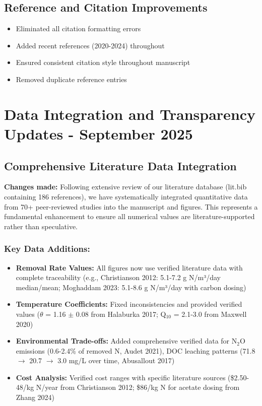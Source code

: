 \documentclass[12pt,a4paper]{article}
\begin{document}
\subsection{Reference and Citation Improvements}
\begin{itemize}
\item Eliminated all citation formatting errors
\item Added recent references (2020-2024) throughout
\item Ensured consistent citation style throughout manuscript
\item Removed duplicate reference entries
\end{itemize}

\section{Data Integration and Transparency Updates - September 2025}

\subsection{Comprehensive Literature Data Integration}
\textbf{Changes made:} Following extensive review of our literature database (lit.bib containing 186 references), we have systematically integrated quantitative data from 70+ peer-reviewed studies into the manuscript and figures. This represents a fundamental enhancement to ensure all numerical values are literature-supported rather than speculative.

\subsubsection{Key Data Additions:}
\begin{itemize}
\item \textbf{Removal Rate Values:} All figures now use verified literature data with complete traceability (e.g., Christianson 2012: 5.1-7.2 g N/m³/day median/mean; Moghaddam 2023: 5.1-8.6 g N/m³/day with carbon dosing)
\item \textbf{Temperature Coefficients:} Fixed inconsistencies and provided verified values ($\theta$ = 1.16 $\pm$ 0.08 from Halaburka 2017; Q$_{10}$ = 2.1-3.0 from Maxwell 2020)
\item \textbf{Environmental Trade-offs:} Added comprehensive verified data for N$_2$O emissions (0.6-2.4\% of removed N, Audet 2021), DOC leaching patterns (71.8 $\rightarrow$ 20.7 $\rightarrow$ 3.0 mg/L over time, Abusallout 2017)
\item \textbf{Cost Analysis:} Verified cost ranges with specific literature sources (\$2.50-48/kg N/year from Christianson 2012; \$86/kg N for acetate dosing from Zhang 2024)
\end{itemize}
\end{document}
